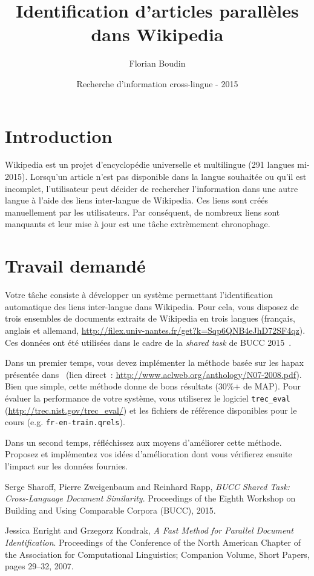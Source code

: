 \documentclass[12pt,a4paper]{article}
\begin{document}
\title{Identification d'articles parallèles dans Wikipedia}
\author{Florian Boudin}
\date{Recherche d'information cross-lingue - 2015}

\maketitle

\section{Introduction}

Wikipedia est un projet d'encyclopédie universelle et multilingue (291 langues mi-2015).
%
Lorsqu'un article n'est pas disponible dans la langue souhaitée ou qu'il est incomplet, l'utilisateur peut décider de rechercher l'information dans une autre langue à l'aide des liens inter-langue de Wikipedia.
%
Ces liens sont créés manuellement par les utilisateurs.
%
Par conséquent, de nombreux liens sont manquants et leur mise à jour est une tâche extrèmement chronophage.

\section{Travail demandé}

Votre tâche consiste à développer un système permettant l'identification automatique des liens inter-langue dans Wikipedia.
%
Pour cela, vous disposez de trois ensembles de documents extraits de Wikipedia en trois langues (français, anglais et allemand, \url{http://filex.univ-nantes.fr/get?k=Sqp6QNB4eJhD72SF4qz}).
%
Ces données ont été utilisées dans le cadre de la \textit{shared task} de BUCC 2015~\cite{bucc2015}.


Dans un premier temps, vous devez implémenter la méthode basée sur les hapax présentée dans~\cite{enright2007} (lien direct~: \url{http://www.aclweb.org/anthology/N07-2008.pdf}).
%
Bien que simple, cette méthode donne de bons résultats (30\%+ de MAP).
%
Pour évaluer la performance de votre système, vous utiliserez le logiciel \texttt{trec\_eval} (\url{http://trec.nist.gov/trec_eval/}) et les fichiers de référence disponibles pour le cours (e.g. \texttt{fr-en-train.qrels}).

Dans un second temps, réfléchissez aux moyens d'améliorer cette méthode.
%
Proposez et implémentez vos idées d'amélioration dont vous vérifierez ensuite l'impact sur les données fournies.

\begin{thebibliography}{9}

  Serge Sharoff, Pierre Zweigenbaum and Reinhard Rapp,
  \emph{BUCC Shared Task: Cross-Language Document Similarity}.
  Proceedings of the Eighth Workshop on Building and Using Comparable Corpora (BUCC),
  2015.

  Jessica Enright and Grzegorz Kondrak,
  \emph{A Fast Method for Parallel Document Identification}.
  Proceedings of the Conference of the North American Chapter of the Association for Computational Linguistics; Companion Volume, Short Papers,
  pages 29--32,
  2007.

\end{thebibliography}
\end{document}
